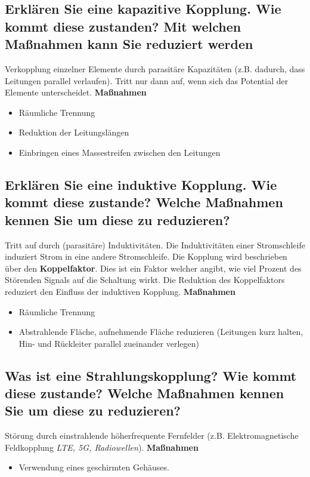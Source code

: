 \subsection{Erklären Sie eine kapazitive Kopplung. Wie kommt diese zustanden? Mit welchen Maßnahmen kann Sie reduziert werden}
Verkopplung einzelner Elemente durch parasitäre Kapazitäten (z.B. dadurch, dass Leitungen parallel verlaufen). Tritt nur dann auf, wenn sich das Potential der Elemente unterscheidet.\p
\textbf{Maßnahmen}
\begin{itemize}
  \item Räumliche Trennung
  \item Reduktion der Leitungslängen
  \item Einbringen eines Massestreifen zwischen den Leitungen
\end{itemize}

\subsection{Erklären Sie eine induktive Kopplung. Wie kommt diese zustande? Welche Maßnahmen kennen Sie um diese zu reduzieren?}
Tritt auf durch (parasitäre) Induktivitäten. Die Induktivitäten einer Stromschleife induziert Strom in eine andere Stromschleife.\p
Die Kopplung wird beschrieben über den \textbf{Koppelfaktor}. Dies ist ein Faktor welcher angibt, wie viel Prozent des Störenden Signals auf die Schaltung wirkt. Die Reduktion des Koppelfaktors reduziert den Einfluss der induktiven Kopplung.\p
\textbf{Maßnahmen}
\begin{itemize}
  \item Räumliche Trennung
  \item Abstrahlende Fläche, aufnehmende Fläche reduzieren (Leitungen kurz halten, Hin- und Rückleiter parallel zueinander verlegen)
\end{itemize}

\subsection{Was ist eine Strahlungskopplung? Wie kommt diese zustande? Welche Maßnahmen kennen Sie um diese zu reduzieren?}
Störung durch einstrahlende höherfrequente Fernfelder (z.B. Elektromagnetische Feldkopplung \textit{LTE, 5G, Radiowellen}).\p
%
\textbf{Maßnahmen}
\begin{itemize}
  \item Verwendung eines geschirmten Gehäuses.
\end{itemize}


